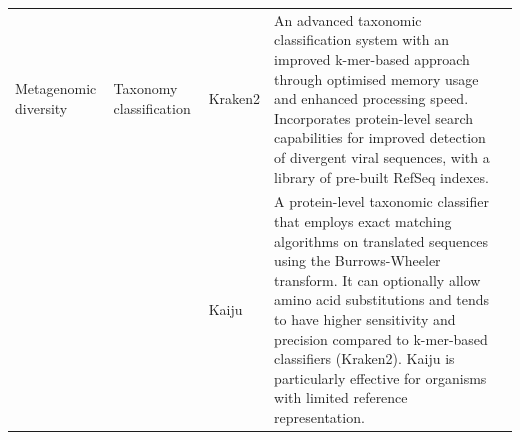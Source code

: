 \begin{longtable}{p{2cm}p{1.8cm}p{1.8cm}p{8.3cm}p{1cm}}
Metagenomic diversity & Taxonomy classification & Kraken2 & An advanced taxonomic classification system with an improved k-mer-based approach through optimised memory usage and enhanced processing speed. Incorporates protein-level search capabilities for improved detection of divergent viral sequences, with a library of pre-built RefSeq indexes. & \citep{Wood2019-jl} \\
\cmidrule{3-5}
 &  & Kaiju & A protein-level taxonomic classifier that employs exact matching algorithms on translated sequences using the Burrows-Wheeler transform. It can optionally allow amino acid substitutions and tends to have higher sensitivity and precision compared to k-mer-based classifiers (Kraken2). Kaiju is particularly effective for organisms with limited reference representation. & \citep{Menzel2016-tz} \\
\midrule


\end{longtable}
